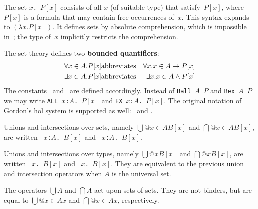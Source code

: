 The set \hbox{\tt{\ttlbrace}$x$.\ $P[x]${\ttrbrace}} consists of all $x$ (of suitable type)
that satisfy~$P[x]$, where $P[x]$ is a formula that may contain free
occurrences of~$x$.  This syntax expands to $(\lambda
x. P[x])$.  It defines sets by absolute comprehension, which is impossible
in~{\ZF}; the type of~$x$ implicitly restricts the comprehension.

The set theory defines two {\bf bounded quantifiers}:
\begin{eqnarray*}
   \forall x\in A. P[x] &\hbox{abbreviates}& \forall x. x\in A\rightarrow P[x] \\
   \exists x\in A. P[x] &\hbox{abbreviates}& \exists x. x\in A\wedge P[x]
\end{eqnarray*}
The constants~ and~ are defined
accordingly.  Instead of \texttt{Ball $A$ $P$} and \texttt{Bex $A$ $P$} we may
write
%
\hbox{\tt ALL~$x$:$A$.\ $P[x]$} and \hbox{\tt EX~$x$:$A$.\ $P[x]$}.  The
original notation of Gordon's {\sc hol} system is supported as well: \sdx{!}\ 
and .

Unions and intersections over sets, namely $\bigcup@{x\in A}B[x]$ and
$\bigcap@{x\in A}B[x]$, are written 
~\hbox{\tt$x$:$A$.\ $B[x]$} and
~\hbox{\tt$x$:$A$.\ $B[x]$}.  

Unions and intersections over types, namely $\bigcup@x B[x]$ and $\bigcap@x
B[x]$, are written \sdx{UN}~\hbox{\tt$x$.\ $B[x]$} and
~\hbox{\tt$x$.\ $B[x]$}.  They are equivalent to the previous
union and intersection operators when $A$ is the universal set.

The operators $\bigcup A$ and $\bigcap A$ act upon sets of sets.  They are
not binders, but are equal to $\bigcup@{x\in A}x$ and $\bigcap@{x\in A}x$,
respectively.



